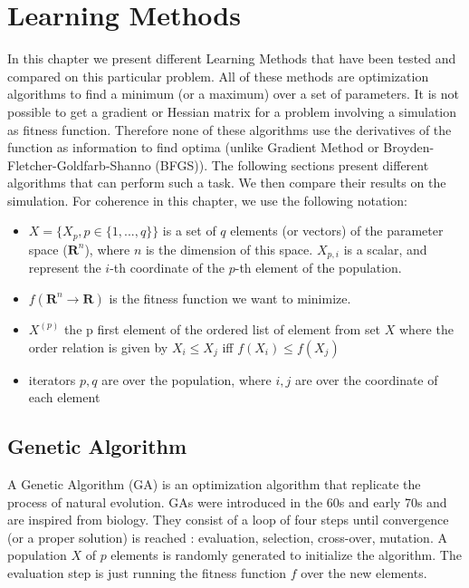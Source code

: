 
\chapter{Learning Methods} %

\label{Chapter 4} %


In this chapter we present different Learning Methods that have been tested and compared on this particular problem. All of these methods are optimization algorithms to find a minimum (or a maximum) over a set of parameters. It is not possible to get a gradient or Hessian matrix for a problem involving a simulation as fitness function. Therefore none of these algorithms use the derivatives of the function as information to find optima (unlike Gradient Method or Broyden-Fletcher-Goldfarb-Shanno (BFGS)). The following sections present different algorithms that can perform such a task. We then compare their results on the simulation. For coherence in this chapter, we use the following notation: 

\begin{itemize}
    \item $X = \{ X_p, p\in{\{1, ..., q\}}\} $ is a set of $q$ elements (or vectors) of the parameter space ($\mathbf{R}^ n $), where $n$ is the dimension of this space. $X_{p,i}$ is a scalar, and represent the $i$-th coordinate of the $p$-th element of the population.
    \item $f (\mathbf{R} ^ n \to \mathbf{R})$ is the fitness function we want to minimize.
    \item $X^{(p)}$ the p first element of the ordered list of element from set $X$ where the order relation is given by $X_i \leq X_j$ iff $f(X_i) \leq f(X_j)$
    \item iterators $p, q$ are over the population, where $i, j$ are over the coordinate of each element  
\end{itemize}

\section{Genetic Algorithm}

A Genetic Algorithm (GA) is an optimization algorithm that replicate the process of natural evolution. GAs were introduced in the 60s and early 70s and are inspired from biology. They consist of a loop of four steps until convergence (or a proper solution) is reached : evaluation, selection, cross-over, mutation. A population $X$ of $p$ elements is randomly generated to initialize the algorithm. The evaluation step is just running the fitness function $f$ over the new elements.

